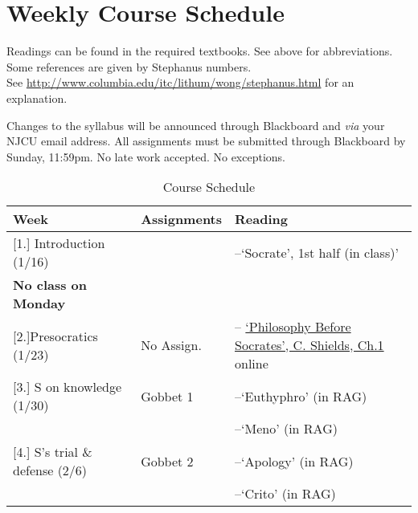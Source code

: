 \documentclass[article,oneside]{memoir}
\begin{document}
\section{Weekly Course Schedule}
Readings can be found in the required textbooks. See above for abbreviations. Some references are given by Stephanus numbers.\\ See \href{http://www.columbia.edu/itc/lithum/wong/stephanus.html}{http://www.columbia.edu/itc/lithum/wong/stephanus.html} for an explanation. 

 Changes to the syllabus will be announced through Blackboard and \emph{via} your NJCU email address.  All assignments must be submitted through Blackboard by Sunday, 11:59pm. No late work accepted. No exceptions.   \newline

\begin{center}
\begin{longtable}{p{4.5cm}p{2cm}p{4.5cm}}
 
  \caption{Course Schedule} \\
  \toprule
  \textbf{Week} &\textbf{Assignments} & \textbf{Reading} \\
  \midrule

  

[1.] Introduction (1/16)	&  		& --`Socrate', 1st half (in class)' \\ 
\textbf{No class on Monday}		&		  &    \\ [1.8\baselineskip] \hline

[2.]Presocratics (1/23)	  	& No Assign.			& -- \href{https://scottoconnor.org/ancient/Shields2.pdf}{`Philosophy Before Socrates', C. Shields, Ch.1} online  \\ [1.8\baselineskip] \hline

[3.] S on knowledge (1/30)			& Gobbet 1		& --`Euthyphro'  (in RAG) \\
			        				&			  	&  --`Meno' (in RAG) \\ [1.8\baselineskip]  \hline %

[4.] S's trial \& defense (2/6)		& Gobbet 2		& --`Apology' (in RAG) \\
			     				& 			         & --`Crito' (in RAG)  \\ [1.8\baselineskip]  \hline


\end{longtable}
\end{center}
\end{document}
